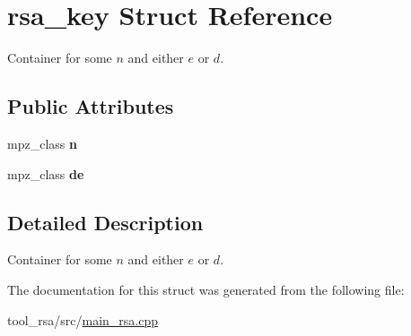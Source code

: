 \hypertarget{structrsa__key}{}\section{rsa\+\_\+key Struct Reference}
\label{structrsa__key}


Container for some $ n $ and either $ e $ or $ d $.  


\subsection*{Public Attributes}
\begin{DoxyCompactItemize}
\item 
mpz\+\_\+class {\bfseries n}\hypertarget{structrsa__key_a64790a418deaa8a57b458af968cdb609}{}\label{structrsa__key_a64790a418deaa8a57b458af968cdb609}

\item 
mpz\+\_\+class {\bfseries de}\hypertarget{structrsa__key_afde8407fac7e73503bac679b0c4bb16c}{}\label{structrsa__key_afde8407fac7e73503bac679b0c4bb16c}

\end{DoxyCompactItemize}


\subsection{Detailed Description}
Container for some $ n $ and either $ e $ or $ d $. 

The documentation for this struct was generated from the following file\+:\begin{DoxyCompactItemize}
\item 
tool\+\_\+rsa/src/\hyperlink{main__rsa_8cpp}{main\+\_\+rsa.\+cpp}\end{DoxyCompactItemize}
